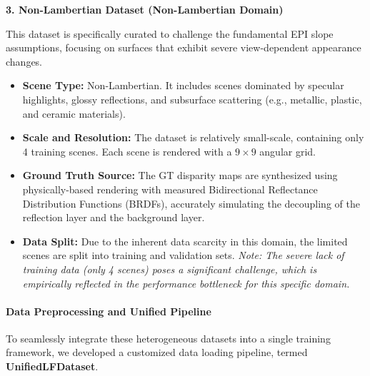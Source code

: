 \documentclass[lettersize,journal]{IEEEtran}
\begin{document}
\textbf{3. Non-Lambertian Dataset (Non-Lambertian Domain)}

This dataset is specifically curated to challenge the fundamental EPI slope assumptions, focusing on surfaces that exhibit severe view-dependent appearance changes.
\begin{itemize}
\item \textbf{Scene Type:} Non-Lambertian. It includes scenes dominated by specular highlights, glossy reflections, and subsurface scattering (e.g., metallic, plastic, and ceramic materials).
\item \textbf{Scale and Resolution:} The dataset is relatively small-scale, containing only 4 training scenes. Each scene is rendered with a $9 \times 9$ angular grid. 
\item \textbf{Ground Truth Source:} The GT disparity maps are synthesized using physically-based rendering with measured Bidirectional Reflectance Distribution Functions (BRDFs), accurately simulating the decoupling of the reflection layer and the background layer.
\item \textbf{Data Split:} Due to the inherent data scarcity in this domain, the limited scenes are split into training and validation sets. \textit{Note: The severe lack of training data (only 4 scenes) poses a significant challenge, which is empirically reflected in the performance bottleneck for this specific domain.}
\end{itemize}

\paragraph{Data Preprocessing and Unified Pipeline}

To seamlessly integrate these heterogeneous datasets into a single training framework, we developed a customized data loading pipeline, termed \textbf{UnifiedLFDataset}. 
\end{document}
